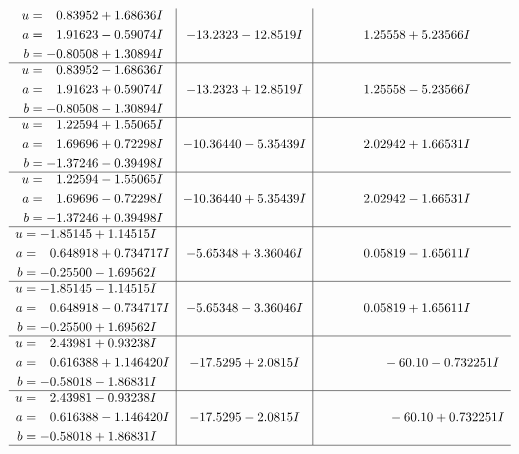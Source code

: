 \documentclass[1p]{elsarticle_modified}
\theoremstyle{definition}
\begin{document}
$$\begin{array}{c|c|c}
\begin{aligned}
u &= \phantom{-}0.83952 + 1.68636 I \\
a &= \phantom{-}1.91623 - 0.59074 I \\
b &= -0.80508 + 1.30894 I\end{aligned}
 & -13.2323 - 12.8519 I & \phantom{-}1.25558 + 5.23566 I \\ \hline\begin{aligned}
u &= \phantom{-}0.83952 - 1.68636 I \\
a &= \phantom{-}1.91623 + 0.59074 I \\
b &= -0.80508 - 1.30894 I\end{aligned}
 & -13.2323 + 12.8519 I & \phantom{-}1.25558 - 5.23566 I \\ \hline\begin{aligned}
u &= \phantom{-}1.22594 + 1.55065 I \\
a &= \phantom{-}1.69696 + 0.72298 I \\
b &= -1.37246 - 0.39498 I\end{aligned}
 & -10.36440 - 5.35439 I & \phantom{-}2.02942 + 1.66531 I \\ \hline\begin{aligned}
u &= \phantom{-}1.22594 - 1.55065 I \\
a &= \phantom{-}1.69696 - 0.72298 I \\
b &= -1.37246 + 0.39498 I\end{aligned}
 & -10.36440 + 5.35439 I & \phantom{-}2.02942 - 1.66531 I \\ \hline\begin{aligned}
u &= -1.85145 + 1.14515 I \\
a &= \phantom{-}0.648918 + 0.734717 I \\
b &= -0.25500 - 1.69562 I\end{aligned}
 & -5.65348 + 3.36046 I & \phantom{-}0.05819 - 1.65611 I \\ \hline\begin{aligned}
u &= -1.85145 - 1.14515 I \\
a &= \phantom{-}0.648918 - 0.734717 I \\
b &= -0.25500 + 1.69562 I\end{aligned}
 & -5.65348 - 3.36046 I & \phantom{-}0.05819 + 1.65611 I \\ \hline\begin{aligned}
u &= \phantom{-}2.43981 + 0.93238 I \\
a &= \phantom{-}0.616388 + 1.146420 I \\
b &= -0.58018 - 1.86831 I\end{aligned}
 & -17.5295 + 2.0815 I & \phantom{-0.000000 }      -6
0. 10   - 0.732251 I \\ \hline\begin{aligned}
u &= \phantom{-}2.43981 - 0.93238 I \\
a &= \phantom{-}0.616388 - 1.146420 I \\
b &= -0.58018 + 1.86831 I\end{aligned}
 & -17.5295 - 2.0815 I & \phantom{-0.000000 -}     -6
0. 10   + 0.732251 I\\
 \hline 
 \end{array}$$\newpage\newpage\renewcommand{\arraystretch}{1}
\end{document}
